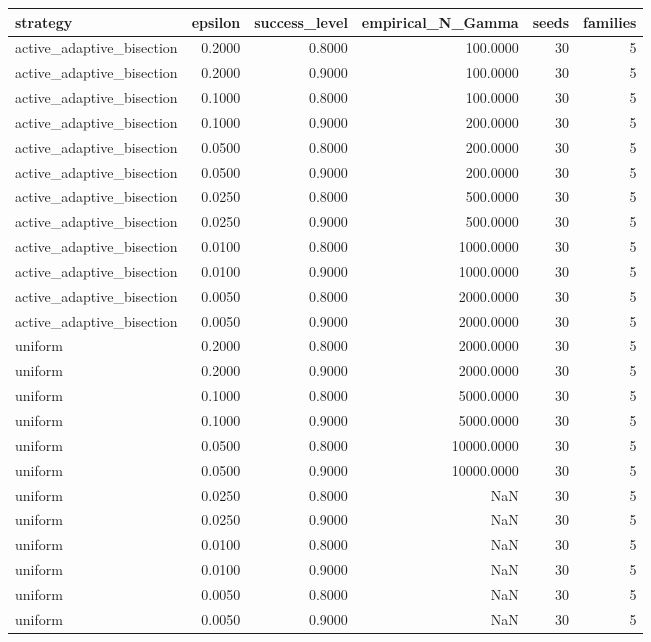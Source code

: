 \begin{tabular}{lrrrrr}
\toprule
strategy & epsilon & success_level & empirical_N_Gamma & seeds & families \\
\midrule
active_adaptive_bisection & 0.2000 & 0.8000 & 100.0000 & 30 & 5 \\
active_adaptive_bisection & 0.2000 & 0.9000 & 100.0000 & 30 & 5 \\
active_adaptive_bisection & 0.1000 & 0.8000 & 100.0000 & 30 & 5 \\
active_adaptive_bisection & 0.1000 & 0.9000 & 200.0000 & 30 & 5 \\
active_adaptive_bisection & 0.0500 & 0.8000 & 200.0000 & 30 & 5 \\
active_adaptive_bisection & 0.0500 & 0.9000 & 200.0000 & 30 & 5 \\
active_adaptive_bisection & 0.0250 & 0.8000 & 500.0000 & 30 & 5 \\
active_adaptive_bisection & 0.0250 & 0.9000 & 500.0000 & 30 & 5 \\
active_adaptive_bisection & 0.0100 & 0.8000 & 1000.0000 & 30 & 5 \\
active_adaptive_bisection & 0.0100 & 0.9000 & 1000.0000 & 30 & 5 \\
active_adaptive_bisection & 0.0050 & 0.8000 & 2000.0000 & 30 & 5 \\
active_adaptive_bisection & 0.0050 & 0.9000 & 2000.0000 & 30 & 5 \\
uniform & 0.2000 & 0.8000 & 2000.0000 & 30 & 5 \\
uniform & 0.2000 & 0.9000 & 2000.0000 & 30 & 5 \\
uniform & 0.1000 & 0.8000 & 5000.0000 & 30 & 5 \\
uniform & 0.1000 & 0.9000 & 5000.0000 & 30 & 5 \\
uniform & 0.0500 & 0.8000 & 10000.0000 & 30 & 5 \\
uniform & 0.0500 & 0.9000 & 10000.0000 & 30 & 5 \\
uniform & 0.0250 & 0.8000 & NaN & 30 & 5 \\
uniform & 0.0250 & 0.9000 & NaN & 30 & 5 \\
uniform & 0.0100 & 0.8000 & NaN & 30 & 5 \\
uniform & 0.0100 & 0.9000 & NaN & 30 & 5 \\
uniform & 0.0050 & 0.8000 & NaN & 30 & 5 \\
uniform & 0.0050 & 0.9000 & NaN & 30 & 5 \\
\bottomrule
\end{tabular}

